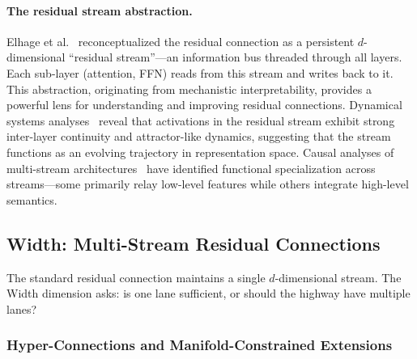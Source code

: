 \paragraph{The residual stream abstraction.}
Elhage et al.~\cite{elhage2021mathematical} reconceptualized the residual connection as a persistent $d$-dimensional ``residual stream''---an information bus threaded through all layers. Each sub-layer (attention, FFN) reads from this stream and writes back to it. This abstraction, originating from mechanistic interpretability, provides a powerful lens for understanding and improving residual connections. Dynamical systems analyses~\cite{neuroscirs2025} reveal that activations in the residual stream exhibit strong inter-layer continuity and attractor-like dynamics, suggesting that the stream functions as an evolving trajectory in representation space. Causal analyses of multi-stream architectures~\cite{penghc2026} have identified functional specialization across streams---some primarily relay low-level features while others integrate high-level semantics.

\subsection{Width: Multi-Stream Residual Connections}
\label{subsec:residual_width}

The standard residual connection maintains a single $d$-dimensional stream. The Width dimension asks: is one lane sufficient, or should the highway have multiple lanes?

\subsubsection{Hyper-Connections and Manifold-Constrained Extensions}

